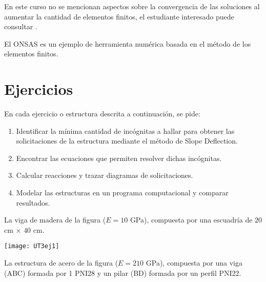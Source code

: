 En este curso no se mencionan aspectos sobre la convergencia de las soluciones al aumentar la cantidad de elementos finitos, el estudiante interesado puede consultar \citep{Hughes1987a}.

El ONSAS es un ejemplo de herramienta numérica basada en el método de los elementos finitos.

%
%
%
%








\section{Ejercicios}
\setcounter{ejercicio}{0}

En cada ejercicio o estructura descrita a continuación, se pide:
%
\begin{enumerate}
  \item Identificar la mínima cantidad de incógnitas a hallar para obtener las solicitaciones de la estructura mediante el método de Slope Deflection.
  \item  Encontrar las ecuaciones que permiten resolver dichas incógnitas.
  \item  Calcular reacciones y trazar diagramas de solicitaciones.
  \item  Modelar las estructuras en un programa computacional y comparar resultados.
\end{enumerate}

\ejercicio

La viga de madera de la figura ($E=10$ GPa), compuesta por una escuadría de $20$ cm $\times$ $40$ cm.

\begin{center}
	\texttt{[image: UT3ej1]}
\end{center}


\ejercicio

La estructura de acero de la figura ($E=210$ GPa), compuesta por una viga (ABC) formada por 1 PNI28 y un pilar (BD) formada por un perfil PNI22.

